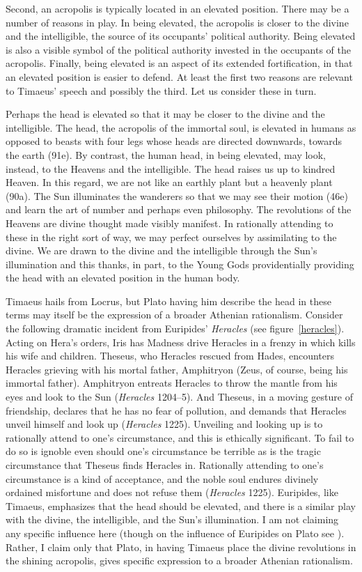 Second, an acropolis is typically located in an elevated position. There may be a number of reasons in play. In being elevated, the acropolis is closer to the divine and the intelligible, the source of its occupants' political authority. Being elevated is also a visible symbol of the political authority invested in the occupants of the acropolis. Finally, being elevated is an aspect of its extended fortification, in that an elevated position is easier to defend. At least the first two reasons are relevant to Timaeus' speech and possibly the third. Let us consider these in turn.

Perhaps the head is elevated so that it may be closer to the divine and the intelligible. The head, the acropolis of the immortal soul, is elevated in humans as opposed to beasts with four legs whose heads are directed downwards, towards the earth (91e). By contrast, the human head, in being elevated, may look, instead, to the Heavens and the intelligible. The head raises us up to kindred Heaven. In this regard, we are not like an earthly plant but a heavenly plant (90a). The Sun illuminates the wanderers so that we may see their motion (46e) and learn the art of number and perhaps even philosophy. The revolutions of the Heavens are divine thought made visibly manifest. In rationally attending to these in the right sort of way, we may perfect ourselves by assimilating to the divine. We are drawn to the divine and the intelligible through the Sun's illumination and this thanks, in part, to the Young Gods providentially providing the head with an elevated position in the human body. 

Timaeus hails from Locrus, but Plato having him describe the head in these terms may itself be the expression of a broader Athenian rationalism. Consider the following dramatic incident from Euripides' \emph{Heracles} (see figure~\ref{heracles}). Acting on Hera's orders, Iris has Madness drive Heracles in a frenzy in which kills his wife and children. Theseus, who Heracles rescued from Hades, encounters Heracles grieving with his mortal father, Amphitryon (Zeus, of course, being his immortal father). Amphitryon entreats Heracles to throw the mantle from his eyes and look to the Sun (\emph{Heracles} 1204--5). And Theseus, in a moving gesture of friendship, declares that he has no fear of pollution, and demands that Heracles unveil himself and look up (\emph{Heracles} 1225). Unveiling and looking up is to rationally attend to one's circumstance, and this is ethically significant. To fail to do so is ignoble even should one's circumstance be terrible as is the tragic circumstance that Theseus finds Heracles in. Rationally attending to one's circumstance is a kind of acceptance, and the noble soul endures divinely ordained misfortune and does not refuse them (\emph{Heracles} 1225). Euripides, like Timaeus, emphasizes that the head should be elevated, and there is a similar play with the divine, the intelligible, and the Sun's illumination. I am not claiming any specific influence here (though on the influence of Euripides on Plato see \citealt{Sansone:1996ux}). Rather, I claim only that Plato, in having Timaeus place the divine revolutions in the shining acropolis, gives specific expression to a broader Athenian rationalism.


